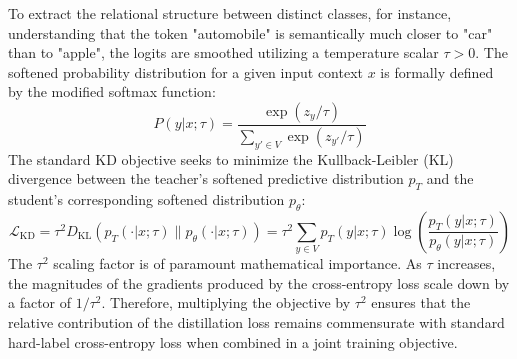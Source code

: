 \documentclass{article} %
\newcommand{\KL}{D_{\mathrm{KL}}}
\newcommand{\ptheta}{p_\theta}
\newcommand{\pteacher}{p_T}
\newcommand{\loss}{\mathcal{L}}
\begin{document}
To extract the relational structure between distinct classes, for instance, understanding that the token "automobile" is semantically much closer to "car" than to "apple", the logits are smoothed utilizing a temperature scalar $\tau > 0$. The softened probability distribution for a given input context $x$ is formally defined by the modified softmax function:
\begin{equation}
    P(y|x; \tau) = \frac{\exp(z_y / \tau)}{\sum_{y' \in V} \exp(z_{y'} / \tau)}
\end{equation}
The standard KD objective seeks to minimize the Kullback-Leibler (KL) divergence between the teacher's softened predictive distribution $\pteacher$ and the student's corresponding softened distribution $\ptheta$:
\begin{equation}
    \loss_{\mathrm{KD}} = \tau^2 \KL(\pteacher(\cdot|x; \tau) \parallel \ptheta(\cdot|x; \tau)) = \tau^2 \sum_{y \in V} \pteacher(y|x; \tau) \log \left( \frac{\pteacher(y|x; \tau)}{\ptheta(y|x; \tau)} \right)
\end{equation}
The $\tau^2$ scaling factor is of paramount mathematical importance. As $\tau$ increases, the magnitudes of the gradients produced by the cross-entropy loss scale down by a factor of $1/\tau^2$. Therefore, multiplying the objective by $\tau^2$ ensures that the relative contribution of the distillation loss remains commensurate with standard hard-label cross-entropy loss when combined in a joint training objective. 
\end{document}
